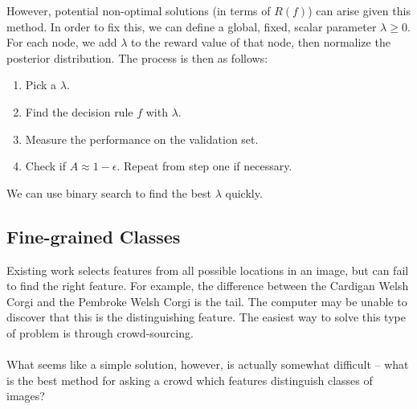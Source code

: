 \documentclass[11pt]{article}
\begin{document}
However, potential non-optimal solutions (in terms of $R(f)$) can arise given this method. In order to fix this, we can define a global, fixed, scalar parameter $\lambda \ge 0$. For each node, we add $\lambda$ to the reward value of that node, then normalize the posterior distribution. The process is then as follows:
\begin{enumerate}
\item Pick a $\lambda$.
\item Find the decision rule $f$ with $\lambda$.
\item Measure the performance on the validation set.
\item Check if $A \approx 1 - \epsilon$. Repeat from step one if necessary. 
\end{enumerate}
We can use binary search to find the best $\lambda$ quickly.\\
\subsection{Fine-grained Classes}
Existing work selects features from all possible locations in an image, but can fail to find the right feature. For example, the difference between the Cardigan Welsh Corgi and the Pembroke Welsh Corgi is the tail. The computer may be unable to discover that this is the distinguishing feature. The easiest way to solve this type of problem is through crowd-sourcing. \\ \\
What seems like a simple solution, however, is actually somewhat difficult -- what is the best method for asking a crowd which features distinguish classes of images? \\
\end{document}
